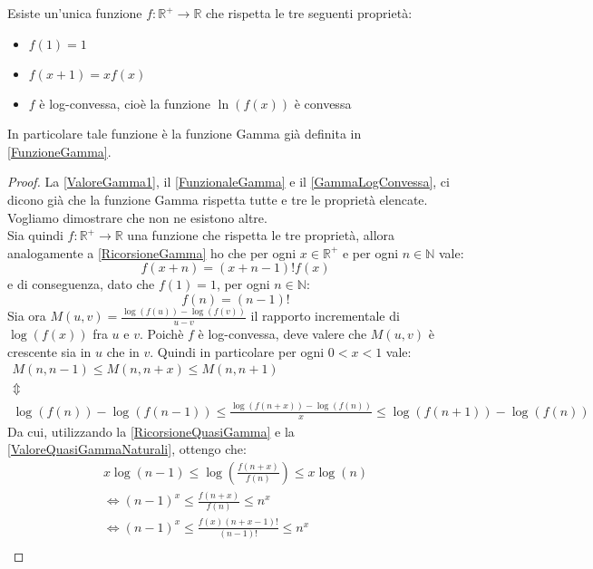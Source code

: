 \begin{theorem} \label{BohrMollerup}
	Esiste un'unica funzione $f :\mathbb{R}^{+}\to\mathbb{R} $ che rispetta le tre seguenti proprietà:
	\begin{itemize}
		\item $f(1)=1$
		\item $f(x+1)=xf(x)$
		\item $f$ è log-convessa, cioè la funzione $\ln(f(x))$ è convessa
	\end{itemize}
	In particolare tale funzione è la funzione Gamma già definita in \cref{FunzioneGamma}.
\end{theorem}
\begin{proof}
	La \cref{ValoreGamma1}, il \cref{FunzionaleGamma} e il \cref{GammaLogConvessa}, ci dicono già che la funzione
	Gamma rispetta tutte e tre le proprietà elencate. Vogliamo dimostrare che non ne esistono altre.\\
	Sia quindi $f:\mathbb{R^+}\to\mathbb{R}$ una funzione che rispetta le tre proprietà, allora analogamente a 
	\cref{RicorsioneGamma} ho che per ogni $x\in \mathbb{R^+}$ e per ogni $n\in\mathbb{N}$ vale:
	\begin{equation}\label{RicorsioneQuasiGamma}
		f(x+n)=(x+n-1)!f(x)
	\end{equation}
	e di conseguenza, dato che $f(1)=1$, per ogni $n\in\mathbb{N}$:
	\begin{equation}\label{ValoreQuasiGammaNaturali}
		f(n)=(n-1)!
	\end{equation}
	Sia ora $M(u,v)=\frac{\log(f(u))-\log(f(v))}{u-v}$ il rapporto incrementale
	di $\log(f(x))$ fra $u$ e $v$. Poichè $f$ è log-convessa, deve valere che $M(u,v)$ è crescente sia in $u$ che in $v$.
	Quindi in particolare per ogni $0<x<1$ vale:
	\begin{gather*}
		M(n,n-1) \le M(n,n+x) \le M(n,n+1) \\
		\Updownarrow \\
		\log(f(n))-\log(f(n-1)) \le \frac{\log(f(n+x))-\log(f(n))}{x} \le \log(f(n+1))-\log(f(n)) 
	\end{gather*}
	Da cui, utilizzando la \cref{RicorsioneQuasiGamma} e la \cref{ValoreQuasiGammaNaturali}, ottengo che:
	\begin{gather*}
		x \log(n-1) \le \log \left( \frac{f(n+x)}{f(n)} \right) \le x\log(n)\\
		\iff (n-1)^x \le \frac{f(n+x)}{f(n)} \le n^x \\
		\iff (n-1)^x \le  \frac{f(x)(n+x-1)!}{(n-1)!}  \le n^x \\

\end{gather*}
\end{proof}
